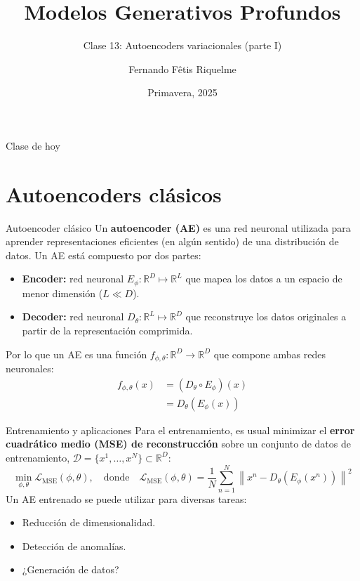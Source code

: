 \documentclass{beamer}
\title{Modelos Generativos Profundos}
\subtitle{Clase 13: Autoencoders variacionales (parte I)}
\author{Fernando Fêtis Riquelme}
\institute{
    Facultad de Ciencias Físicas y Matemáticas\\
    Universidad de Chile
}
\date{Primavera, 2025}
\newcommand{\R}{\mathbb{R}}
\begin{document}
\begin{frame}
    \titlepage
\end{frame}

\begin{frame}{Clase de hoy}
    \tableofcontents
\end{frame}

\section{Autoencoders clásicos}

\begin{frame}{Autoencoder clásico}
    Un \textbf{autoencoder (AE)} es una red neuronal utilizada para aprender representaciones eficientes (en algún sentido) de una distribución de datos. Un AE está compuesto por dos partes:
    \begin{itemize}
        \item \textbf{Encoder:} red neuronal $E_\phi:\R^D\mapsto\R^L$ que mapea los datos a un espacio de menor dimensión ($L\ll D$).
        \item \textbf{Decoder:} red neuronal $D_\theta:\R^L\mapsto\R^D$ que reconstruye los datos originales a partir de la representación comprimida.
    \end{itemize}
    Por lo que un AE es una función $f_{\phi,\theta}:\R^D\to\R^D$ que compone ambas redes neuronales:
    \begin{align*}
        f_{\phi,\theta}(x) & = (D_\theta\circ E_\phi)(x) \\
                           & = D_\theta(E_\phi(x))
    \end{align*}
\end{frame}

\begin{frame}{Entrenamiento y aplicaciones}
    Para el entrenamiento, es usual minimizar el \textbf{error cuadrático medio (MSE) de reconstrucción} sobre un conjunto de datos de entrenamiento, $\mathcal{D}=\{x^1,\ldots,x^N\}\subset\R^D$:
    \begin{equation*}
        \min_{\phi,\theta} \mathcal{L}_{\text{MSE}}(\phi,\theta),
        \quad\text{donde}\quad
        \mathcal{L}_{\text{MSE}}(\phi,\theta) = \frac{1}{N}\sum_{n=1}^N \left\|x^n - D_\theta(E_\phi(x^n))\right\|^2
    \end{equation*}
    Un AE entrenado se puede utilizar para diversas tareas:
    \begin{itemize}
        \item Reducción de dimensionalidad.
        \item Detección de anomalías.
        \item ¿Generación de datos?
    \end{itemize}
\end{frame}
\end{document}
